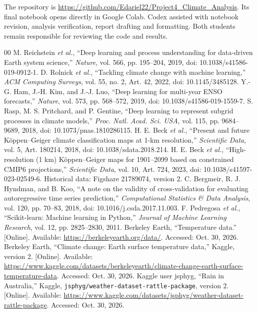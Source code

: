 \documentclass[conference]{IEEEtran}
\begin{document}
The repository is \url{https://github.com/Edariel22/Project4_Climate_Analysis}. Its final notebook opens directly in Google Colab. Codex assisted with notebook revision, analysis verification, report drafting and formatting. Both students remain responsible for reviewing the code and results.

\begin{thebibliography}{00}
 M. Reichstein \emph{et al.}, ``Deep learning and process understanding for data-driven Earth system science,'' \emph{Nature}, vol. 566, pp. 195--204, 2019, doi: 10.1038/s41586-019-0912-1.
 D. Rolnick \emph{et al.}, ``Tackling climate change with machine learning,'' \emph{ACM Computing Surveys}, vol. 55, no. 2, Art. 42, 2022, doi: 10.1145/3485128.
 Y.-G. Ham, J.-H. Kim, and J.-J. Luo, ``Deep learning for multi-year ENSO forecasts,'' \emph{Nature}, vol. 573, pp. 568--572, 2019, doi: 10.1038/s41586-019-1559-7.
 S. Rasp, M. S. Pritchard, and P. Gentine, ``Deep learning to represent subgrid processes in climate models,'' \emph{Proc. Natl. Acad. Sci. USA}, vol. 115, pp. 9684--9689, 2018, doi: 10.1073/pnas.1810286115.
 H. E. Beck \emph{et al.}, ``Present and future K\"oppen--Geiger climate classification maps at 1-km resolution,'' \emph{Scientific Data}, vol. 5, Art. 180214, 2018, doi: 10.1038/sdata.2018.214.
 H. E. Beck \emph{et al.}, ``High-resolution (1 km) K\"oppen--Geiger maps for 1901--2099 based on constrained CMIP6 projections,'' \emph{Scientific Data}, vol. 10, Art. 724, 2023, doi: 10.1038/s41597-023-02549-6. Historical data: Figshare 21789074, version 2.
 C. Bergmeir, R. J. Hyndman, and B. Koo, ``A note on the validity of cross-validation for evaluating autoregressive time series prediction,'' \emph{Computational Statistics \& Data Analysis}, vol. 120, pp. 70--83, 2018, doi: 10.1016/j.csda.2017.11.003.
 F. Pedregosa \emph{et al.}, ``Scikit-learn: Machine learning in Python,'' \emph{Journal of Machine Learning Research}, vol. 12, pp. 2825--2830, 2011.
 Berkeley Earth, ``Temperature data.'' [Online]. Available: \url{https://berkeleyearth.org/data/}. Accessed: Oct. 30, 2026.
 Berkeley Earth, ``Climate change: Earth surface temperature data,'' Kaggle, version 2. [Online]. Available: \url{https://www.kaggle.com/datasets/berkeleyearth/climate-change-earth-surface-temperature-data}. Accessed: Oct. 30, 2026.
 Kaggle user jsphyg, ``Rain in Australia,'' Kaggle, \texttt{jsphyg/weather-dataset-rattle-package}, version 2. [Online]. Available: \url{https://www.kaggle.com/datasets/jsphyg/weather-dataset-rattle-package}. Accessed: Oct. 30, 2026.

\end{thebibliography}
\end{document}
